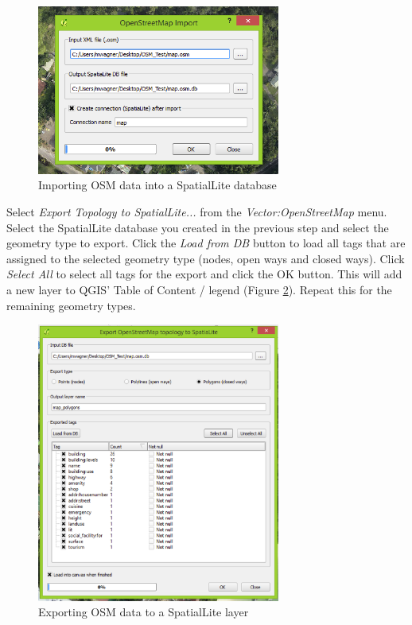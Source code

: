 \documentclass[a4paper,12pt,titlepage]{article}
\begin{document}
 \begin{figure}[H]
 	\centering
 	\includegraphics[width=8cm]{Images/import_2.png}
 	\caption{Importing OSM data into a SpatialLite database}\label{fig:import_2}
 \end{figure}
 
Select \textit{Export Topology to SpatialLite...} from the \textit{Vector:OpenStreetMap} menu. Select the SpatialLite database you created in the previous step and select the geometry type to export. Click the \textit{Load from DB} button to load all tags that are assigned to the selected geometry type (nodes, open ways and closed ways). Click \textit{Select All} to select all tags for the export and click the OK button. This will add a new layer to QGIS' Table of Content / legend (Figure \ref{fig:import_3}). Repeat this for the remaining geometry types.

 \begin{figure}[H]
 	\centering
 	\includegraphics[width=8cm]{Images/import_3.png}
 	\caption{Exporting OSM data to a SpatialLite layer}\label{fig:import_3}
 \end{figure}
 
\end{document}
